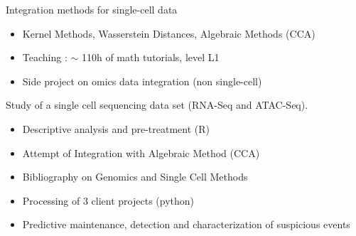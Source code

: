 \documentclass[10pt,a4paper]{altacv}
\begin{document}

 Integration methods for single-cell data
\begin{itemize}
\item Kernel Methods, Wasserstein Distances, Algebraic Methods (CCA)
\item Teaching : $\sim$ 110h of math tutorials, level L1
\item Side project on omics data integration (non single-cell)
\end{itemize}

Study of a single cell sequencing data set (RNA-Seq and ATAC-Seq). 
\begin{itemize}
\item Descriptive analysis and pre-treatment (R) 
\item Attempt of Integration with Algebraic Method (CCA) 
\item Bibliography on Genomics and Single Cell Methods
\end{itemize}

{}

\begin{itemize}
\item Processing of 3 client projects (python)
\item Predictive maintenance, detection and characterization of suspicious events
\end{itemize}
\end{document}
